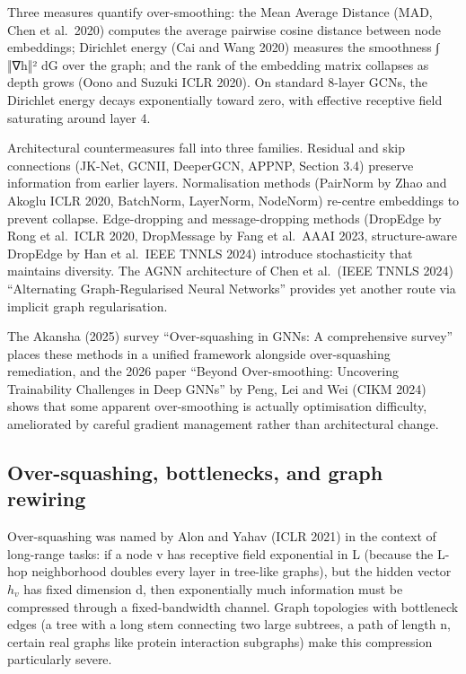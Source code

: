 Three measures quantify over-smoothing: the Mean Average Distance (MAD, Chen et al.~2020) computes the average pairwise cosine distance between node embeddings; Dirichlet energy (Cai and Wang 2020) measures the smoothness ∫ ‖∇h‖² dG over the graph; and the rank of the embedding matrix collapses as depth grows (Oono and Suzuki ICLR 2020). On standard 8-layer GCNs, the Dirichlet energy decays exponentially toward zero, with effective receptive field saturating around layer 4.

Architectural countermeasures fall into three families. Residual and skip connections (JK-Net, GCNII, DeeperGCN, APPNP, Section 3.4) preserve information from earlier layers. Normalisation methods (PairNorm by Zhao and Akoglu ICLR 2020, BatchNorm, LayerNorm, NodeNorm) re-centre embeddings to prevent collapse. Edge-dropping and message-dropping methods (DropEdge by Rong et al.~ICLR 2020, DropMessage by Fang et al.~AAAI 2023, structure-aware DropEdge by Han et al.~IEEE TNNLS 2024) introduce stochasticity that maintains diversity. The AGNN architecture of Chen et al.~(IEEE TNNLS 2024) ``Alternating Graph-Regularised Neural Networks'' provides yet another route via implicit graph regularisation.

The Akansha (2025) survey ``Over-squashing in GNNs: A comprehensive survey'' places these methods in a unified framework alongside over-squashing remediation, and the 2026 paper ``Beyond Over-smoothing: Uncovering Trainability Challenges in Deep GNNs'' by Peng, Lei and Wei (CIKM 2024) shows that some apparent over-smoothing is actually optimisation difficulty, ameliorated by careful gradient management rather than architectural change.

\subsection{Over-squashing, bottlenecks, and graph rewiring}\label{over-squashing-bottlenecks-and-graph-rewiring}

Over-squashing was named by Alon and Yahav (ICLR 2021) in the context of long-range tasks: if a node v has receptive field exponential in L (because the L-hop neighborhood doubles every layer in tree-like graphs), but the hidden vector \(h_v\) has fixed dimension d, then exponentially much information must be compressed through a fixed-bandwidth channel. Graph topologies with bottleneck edges (a tree with a long stem connecting two large subtrees, a path of length n, certain real graphs like protein interaction subgraphs) make this compression particularly severe.

